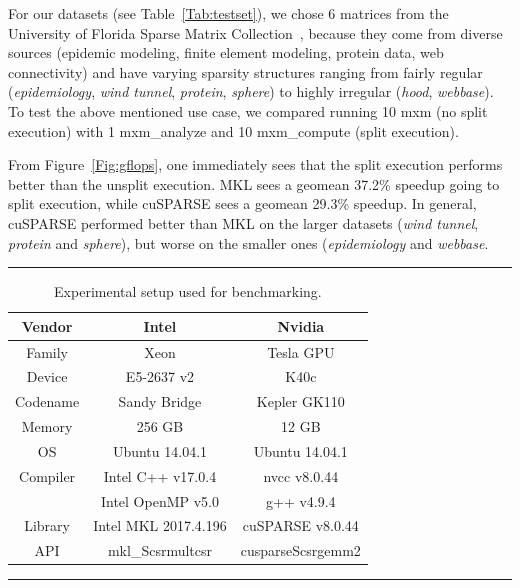 For our datasets (see Table~\ref{Tab:testset}), we chose 6 matrices from the University of Florida Sparse Matrix Collection~\cite{davis2011university}, because they come from diverse sources (epidemic modeling, finite element modeling, protein data, web connectivity) and have varying sparsity structures ranging from fairly regular (\emph{epidemiology}, \emph{wind tunnel}, \emph{protein}, \emph{sphere}) to highly irregular (\emph{hood}, \emph{webbase}). To test the above mentioned use case, we compared running 10 {\sf mxm} (no split execution) with 1 {\sf mxm\_analyze} and 10 {\sf mxm\_compute} (split execution).

From Figure~\ref{Fig:gflops}, one immediately sees that the split execution performs better than the unsplit execution. MKL sees a geomean 37.2\% speedup going to split execution, while cuSPARSE sees a geomean 29.3\% speedup. In general, cuSPARSE performed better than MKL on the larger datasets (\emph{wind tunnel}, \emph{protein} and \emph{sphere}), but worse on the smaller ones (\emph{epidemiology} and \emph{webbase}.

\begin{table}[htb]
	\hrule
	\caption{Experimental setup used for benchmarking.}
	\label{Tab:testbed}
	\begin{center}
		\begin{tabular}{|c|c|c|} \hline
			Vendor & Intel & Nvidia \\ \hline
			Family & Xeon & Tesla GPU \\
			Device & E5-2637 v2 & K40c \\
			Codename & Sandy Bridge & Kepler GK110 \\
			Memory & 256 GB & 12 GB \\
			OS & Ubuntu 14.04.1 & Ubuntu 14.04.1 \\
			Compiler & Intel C++ v17.0.4 & nvcc v8.0.44 \\
			& Intel OpenMP v5.0 & g++ v4.9.4 \\
			Library & Intel MKL 2017.4.196 & cuSPARSE v8.0.44 \\ 
			API & mkl\_Scsrmultcsr & cusparseScsrgemm2 \\ \hline
		\end{tabular}
	\end{center}
	\hrule
\end{table}

